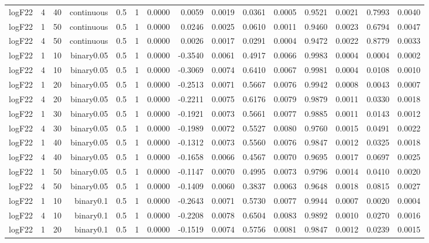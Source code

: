 \begin{longtable}{rrrrrrrrrrrrrrr}
  logF22 & 4 & 40 & continuous & 0.5 & 1 & 0.0000 & 0.0059 & 0.0019 & 0.0361 & 0.0005 & 0.9521 & 0.0021 & 0.7993 & 0.0040 \\ 
  logF22 & 1 & 50 & continuous & 0.5 & 1 & 0.0000 & 0.0246 & 0.0025 & 0.0610 & 0.0011 & 0.9460 & 0.0023 & 0.6794 & 0.0047 \\ 
  logF22 & 4 & 50 & continuous & 0.5 & 1 & 0.0000 & 0.0026 & 0.0017 & 0.0291 & 0.0004 & 0.9472 & 0.0022 & 0.8779 & 0.0033 \\ 
  logF22 & 1 & 10 & binary0.05 & 0.5 & 1 & 0.0000 & -0.3540 & 0.0061 & 0.4917 & 0.0066 & 0.9983 & 0.0004 & 0.0004 & 0.0002 \\ 
  logF22 & 4 & 10 & binary0.05 & 0.5 & 1 & 0.0000 & -0.3069 & 0.0074 & 0.6410 & 0.0067 & 0.9981 & 0.0004 & 0.0108 & 0.0010 \\ 
  logF22 & 1 & 20 & binary0.05 & 0.5 & 1 & 0.0000 & -0.2513 & 0.0071 & 0.5667 & 0.0076 & 0.9942 & 0.0008 & 0.0043 & 0.0007 \\ 
  logF22 & 4 & 20 & binary0.05 & 0.5 & 1 & 0.0000 & -0.2211 & 0.0075 & 0.6176 & 0.0079 & 0.9879 & 0.0011 & 0.0330 & 0.0018 \\ 
  logF22 & 1 & 30 & binary0.05 & 0.5 & 1 & 0.0000 & -0.1921 & 0.0073 & 0.5661 & 0.0077 & 0.9885 & 0.0011 & 0.0143 & 0.0012 \\ 
  logF22 & 4 & 30 & binary0.05 & 0.5 & 1 & 0.0000 & -0.1989 & 0.0072 & 0.5527 & 0.0080 & 0.9760 & 0.0015 & 0.0491 & 0.0022 \\ 
  logF22 & 1 & 40 & binary0.05 & 0.5 & 1 & 0.0000 & -0.1312 & 0.0073 & 0.5560 & 0.0076 & 0.9847 & 0.0012 & 0.0325 & 0.0018 \\ 
  logF22 & 4 & 40 & binary0.05 & 0.5 & 1 & 0.0000 & -0.1658 & 0.0066 & 0.4567 & 0.0070 & 0.9695 & 0.0017 & 0.0697 & 0.0025 \\ 
  logF22 & 1 & 50 & binary0.05 & 0.5 & 1 & 0.0000 & -0.1147 & 0.0070 & 0.4995 & 0.0073 & 0.9796 & 0.0014 & 0.0410 & 0.0020 \\ 
  logF22 & 4 & 50 & binary0.05 & 0.5 & 1 & 0.0000 & -0.1409 & 0.0060 & 0.3837 & 0.0063 & 0.9648 & 0.0018 & 0.0815 & 0.0027 \\ 
  logF22 & 1 & 10 & binary0.1 & 0.5 & 1 & 0.0000 & -0.2643 & 0.0071 & 0.5730 & 0.0077 & 0.9944 & 0.0007 & 0.0020 & 0.0004 \\ 
  logF22 & 4 & 10 & binary0.1 & 0.5 & 1 & 0.0000 & -0.2208 & 0.0078 & 0.6504 & 0.0083 & 0.9892 & 0.0010 & 0.0270 & 0.0016 \\ 
  logF22 & 1 & 20 & binary0.1 & 0.5 & 1 & 0.0000 & -0.1519 & 0.0074 & 0.5756 & 0.0081 & 0.9847 & 0.0012 & 0.0239 & 0.0015 \\ 

\end{longtable}
